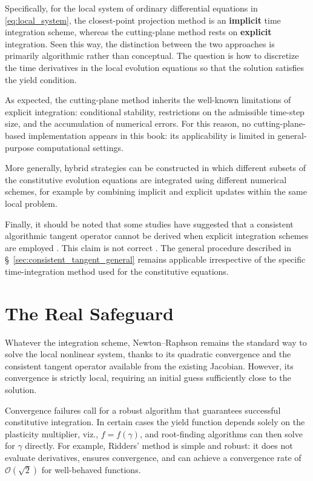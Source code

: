 Specifically, for the local system of ordinary differential equations in \eqref{eq:local_system}, the closest-point projection method is an \textbf{implicit} time integration scheme, whereas the cutting-plane method rests on \textbf{explicit} integration.
Seen this way, the distinction between the two approaches is primarily algorithmic rather than conceptual.
The question is how to discretize the time derivatives in the local evolution equations so that the solution satisfies the yield condition.

As expected, the cutting-plane method inherits the well-known limitations of explicit integration: conditional stability, restrictions on the admissible time-step size, and the accumulation of numerical errors.
For this reason, no cutting-plane-based implementation appears in this book: its applicability is limited in general-purpose computational settings.

More generally, hybrid strategies can be constructed in which different subsets of the constitutive evolution equations are integrated using different numerical schemes, for example by combining implicit and explicit updates within the same local problem.

Finally, it should be noted that some studies have suggested that a consistent algorithmic tangent operator cannot be derived when explicit integration schemes are employed \cite[e.g.,]{Simo1998}.
This claim is not correct \cite{Starman2014}.
The general procedure described in \S~\ref{sec:consistent_tangent_general} remains applicable irrespective of the specific time-integration method used for the constitutive equations.
\section{The Real Safeguard}
Whatever the integration scheme, Newton--Raphson remains the standard way to solve the local nonlinear system, thanks to its quadratic convergence and the consistent tangent operator available from the existing Jacobian.
However, its convergence is strictly local, requiring an initial guess sufficiently close to the solution.

Convergence failures call for a robust algorithm that guarantees successful constitutive integration.
In certain cases the yield function depends solely on the plasticity multiplier, viz., $f=f\left(\gamma\right)$, and root-finding algorithms can then solve for $\gamma$ directly.
For example, Ridders' method is simple and robust: it does not evaluate derivatives, ensures convergence, and can achieve a convergence rate of $\mathcal{O}\left(\sqrt{2}\right)$ for well-behaved functions.

